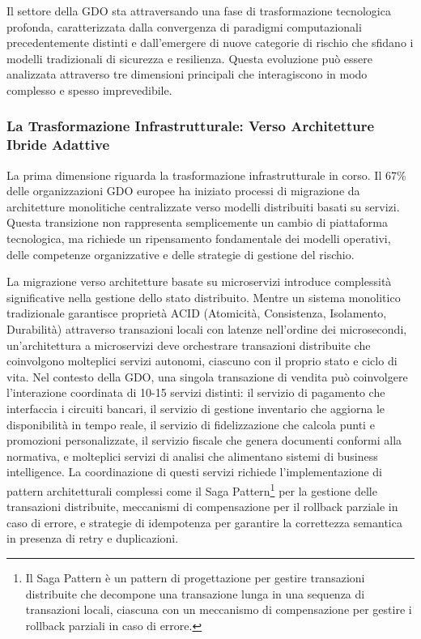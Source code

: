 Il settore della GDO sta attraversando una fase di trasformazione tecnologica profonda, caratterizzata dalla convergenza di paradigmi computazionali precedentemente distinti e dall'emergere di nuove categorie di rischio che sfidano i modelli tradizionali di sicurezza e resilienza. Questa evoluzione può essere analizzata attraverso tre dimensioni principali che interagiscono in modo complesso e spesso imprevedibile.

\subsubsection{La Trasformazione Infrastrutturale: Verso Architetture Ibride Adattive}

La prima dimensione riguarda la trasformazione infrastrutturale in corso. Il 67\% delle organizzazioni GDO europee ha iniziato processi di migrazione da architetture monolitiche centralizzate verso modelli distribuiti basati su servizi\autocite{gartner2024cloud}. Questa transizione non rappresenta semplicemente un cambio di piattaforma tecnologica, ma richiede un ripensamento fondamentale dei modelli operativi, delle competenze organizzative e delle strategie di gestione del rischio.

La migrazione verso architetture basate su microservizi introduce complessità significative nella gestione dello stato distribuito. Mentre un sistema monolitico tradizionale garantisce proprietà ACID (Atomicità, Consistenza, Isolamento, Durabilità) attraverso transazioni locali con latenze nell'ordine dei microsecondi, un'architettura a microservizi deve orchestrare transazioni distribuite che coinvolgono molteplici servizi autonomi, ciascuno con il proprio stato e ciclo di vita. Nel contesto della GDO, una singola transazione di vendita può coinvolgere l'interazione coordinata di 10-15 servizi distinti: il servizio di pagamento che interfaccia i circuiti bancari, il servizio di gestione inventario che aggiorna le disponibilità in tempo reale, il servizio di fidelizzazione che calcola punti e promozioni personalizzate, il servizio fiscale che genera documenti conformi alla normativa, e molteplici servizi di analisi che alimentano sistemi di business intelligence. La coordinazione di questi servizi richiede l'implementazione di pattern architetturali complessi come il Saga Pattern\footnote{Il Saga Pattern è un pattern di progettazione per gestire transazioni distribuite che decompone una transazione lunga in una sequenza di transazioni locali, ciascuna con un meccanismo di compensazione per gestire i rollback parziali in caso di errore.} per la gestione delle transazioni distribuite, meccanismi di compensazione per il rollback parziale in caso di errore, e strategie di idempotenza per garantire la correttezza semantica in presenza di retry e duplicazioni.

